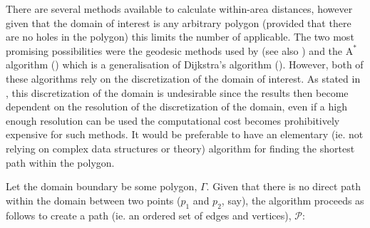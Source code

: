 There are several methods available to calculate within-area distances, however given that the domain of interest is any arbitrary polygon (provided that there are no holes in the polygon) this limits the number of applicable. The two most promising possibilities were the geodesic methods used by \cite{wangranalli} (see also ) and the $\text{A}^*$ algorithm (\cite{astarpaper}) which is a generalisation of Dijkstra's algorithm (\cite{dijkstra}). However, both of these algorithms rely on the discretization of the domain of interest. As stated in , this discretization of the domain is undesirable since the results then become dependent on the resolution of the discretization of the domain, even if a high enough resolution can be used the computational cost becomes prohibitively expensive for such methods. It would be preferable to have an elementary (ie. not relying on complex data structures or theory) algorithm for finding the shortest path within the polygon.

Let the domain boundary be some polygon, $\Gamma$. Given that there is no direct path within the domain between two points ($p_1$ and $p_2$, say), the algorithm proceeds as follows to create a path (ie. an ordered set of edges and vertices), $\mathcal{P}$:

